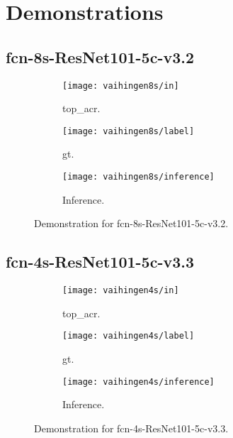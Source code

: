 \section{Demonstrations}
\subsection{\acrshort{fcn}-8s-ResNet101-5c-v3.2}
\begin{figure}[h]
    \centering
    \begin{subfigure}[b]{0.3\linewidth}
        \texttt{[image: vaihingen8s/in]}
        \caption{\acrshort{top_acr}.}
    \end{subfigure}
    \begin{subfigure}[b]{0.3\linewidth}
        \texttt{[image: vaihingen8s/label]}
        \caption{\Gls{gt}.}
    \end{subfigure}
    \begin{subfigure}[b]{0.3\linewidth}
        \texttt{[image: vaihingen8s/inference]}
        \caption{Inference.}
    \end{subfigure}
    \caption{Demonstration for \acrshort{fcn}-8s-ResNet101-5c-v3.2.}
    \label{fig:8s_demo}
\end{figure}

\subsection{\acrshort{fcn}-4s-ResNet101-5c-v3.3}
\begin{figure}[h]
    \centering
    \begin{subfigure}[b]{0.3\linewidth}
        \texttt{[image: vaihingen4s/in]}
        \caption{\acrshort{top_acr}.}
    \end{subfigure}
    \begin{subfigure}[b]{0.3\linewidth}
        \texttt{[image: vaihingen4s/label]}
        \caption{\Gls{gt}.}
    \end{subfigure}
    \begin{subfigure}[b]{0.3\linewidth}
        \texttt{[image: vaihingen4s/inference]}
        \caption{Inference.}
    \end{subfigure}
    \caption{Demonstration for \acrshort{fcn}-4s-ResNet101-5c-v3.3.}
    \label{fig:4s_demo}
\end{figure}

